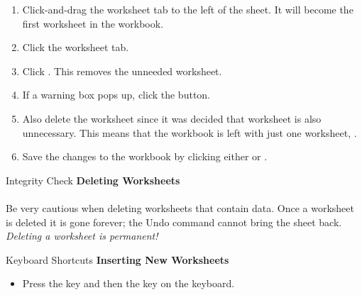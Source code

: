 \begin{enumbox}
	\begin{enumerate}
		\item Click-and-drag the  worksheet tab to the left of the  sheet. It will become the first worksheet in the workbook.
		\item Click the  worksheet tab.
		\item Click . This removes the unneeded worksheet.
		\item If a warning box pops up, click the  button.
		\item Also delete the  worksheet since it was decided that worksheet is also unnecessary. This means that the workbook is left with just one worksheet, .
		\item Save the changes to the workbook by clicking either  or .
	\end{enumerate}
\end{enumbox}
	
\begin{center}
	\begin{infobox}{Integrity Check}
		\textbf{Deleting Worksheets}
		\\
		\\
		Be very cautious when deleting worksheets that contain data. Once a worksheet is deleted it is gone forever; the Undo command cannot bring the sheet back. \textit{Deleting a worksheet is permanent!}
	\end{infobox}
\end{center}

\begin{center}
	\begin{shtcutbox}{Keyboard Shortcuts}
		\textbf{Inserting New Worksheets}
		\\
		\begin{itemize}
			\setlength{\itemsep}{0pt}
			\setlength{\parskip}{0pt}
			\setlength{\parsep}{0pt}
			
			\item Press the  key and then the  key on the keyboard.
			
		\end{itemize}
	\end{shtcutbox}
\end{center}


